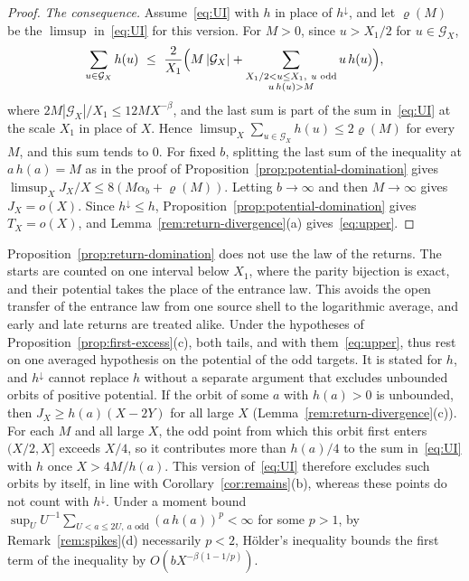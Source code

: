 \documentclass[12pt]{amsart}
\theoremstyle{definition}
\theoremstyle{remark}
\begin{document}
\begin{proof}
\emph{The consequence.} Assume~\eqref{eq:UI} with $h$ in place of $h^\downarrow$, and let $\varrho(M)$ be the $\limsup$ in~\eqref{eq:UI} for this version. For $M>0$, since $u>X_1/2$ for $u\in\mathcal G_X$,
\[
 \sum_{u\in\mathcal G_X}h(u)\ \le\ \frac2{X_1}\Bigl(M\,|\mathcal G_X|+\sum_{\substack{X_1/2<u\le X_1,\ u\text{ odd}\\ u\,h(u)>M}}u\,h(u)\Bigr),
\]
where $2M|\mathcal G_X|/X_1\le12MX^{-\beta}$, and the last sum is part of the sum in~\eqref{eq:UI} at the scale $X_1$ in place of $X$. Hence $\limsup_X\sum_{u\in\mathcal G_X}h(u)\le2\varrho(M)$ for every $M$, and this sum tends to $0$. For fixed $b$, splitting the last sum of the inequality at $a\,h(a)=M$ as in the proof of Proposition~\ref{prop:potential-domination} gives $\limsup_XJ_X/X\le8(M\alpha_b+\varrho(M))$. Letting $b\to\infty$ and then $M\to\infty$ gives $J_X=o(X)$. Since $h^\downarrow\le h$, Proposition~\ref{prop:potential-domination} gives $T_X=o(X)$, and Lemma~\ref{rem:return-divergence}(a) gives~\eqref{eq:upper}.
\end{proof}

Proposition~\ref{prop:return-domination} does not use the law of the returns. The starts are counted on one interval below $X_1$, where the parity bijection is exact, and their potential takes the place of the entrance law. This avoids the open transfer of the entrance law from one source shell to the logarithmic average, and early and late returns are treated alike. Under the hypotheses of Proposition~\ref{prop:first-excess}(c), both tails, and with them~\eqref{eq:upper}, thus rest on one averaged hypothesis on the potential of the odd targets. It is stated for $h$, and $h^\downarrow$ cannot replace $h$ without a separate argument that excludes unbounded orbits of positive potential. If the orbit of some $a$ with $h(a)>0$ is unbounded, then $J_X\ge h(a)(X-2Y)$ for all large $X$ (Lemma~\ref{rem:return-divergence}(c)). For each $M$ and all large $X$, the odd point from which this orbit first enters $(X/2,X]$ exceeds $X/4$, so it contributes more than $h(a)/4$ to the sum in~\eqref{eq:UI} with $h$ once $X>4M/h(a)$. This version of~\eqref{eq:UI} therefore excludes such orbits by itself, in line with Corollary~\ref{cor:remains}(b), whereas these points do not count with $h^\downarrow$. Under a moment bound $\sup_UU^{-1}\sum_{U<a\le2U,\ a\text{ odd}}(a\,h(a))^p<\infty$ for some $p>1$, by Remark~\ref{rem:spikes}(d) necessarily $p<2$, H\"older's inequality bounds the first term of the inequality by $O(bX^{-\beta(1-1/p)})$.
\end{document}
